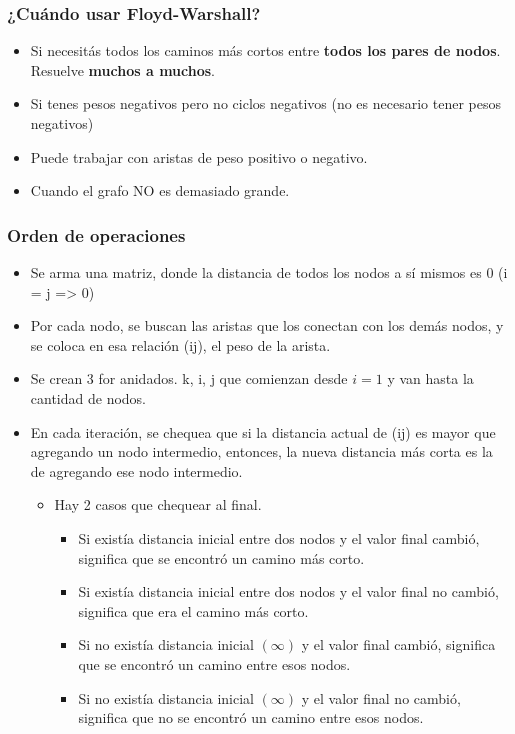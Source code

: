 \documentclass[10pt,a4paper]{article}
\begin{document}
\subsubsection*{¿Cuándo usar Floyd-Warshall?}
\begin{itemize}
    \item Si necesitás todos los caminos más cortos entre \textbf{todos los pares de nodos}. Resuelve \textbf{muchos a muchos}.
    \item Si tenes pesos negativos pero no ciclos negativos (no es necesario tener pesos negativos)
    \item Puede trabajar con aristas de peso positivo o negativo.
    \item Cuando el grafo NO es demasiado grande.
\end{itemize}
\subsubsection*{Orden de operaciones}
\begin{itemize}
    \item Se arma una matriz, donde la distancia de todos los nodos a sí mismos es 0 (i = j => 0)
    \item Por cada nodo, se buscan las aristas que los conectan con los demás nodos, y se coloca en esa relación (ij), el peso de la arista.
    \item Se crean 3 for anidados. k, i, j que comienzan desde $i=1$ y van hasta la cantidad de nodos. 
    \item En cada iteración, se chequea que si la distancia actual de (ij) es mayor que agregando un nodo intermedio, entonces, la nueva distancia más corta es la de agregando ese nodo intermedio.
    \begin{itemize}
        \item Hay 2 casos que chequear al final.
        \begin{itemize}
            \item Si existía distancia inicial entre dos nodos y el valor final cambió, significa que se encontró un camino más corto.
            \item Si existía distancia inicial entre dos nodos y el valor final no cambió, significa que era el camino más corto.
            \item Si no existía distancia inicial $(\infty)$ y el valor final cambió, significa que se encontró un camino entre esos nodos.
            \item Si no existía distancia inicial $(\infty)$ y el valor final no cambió, significa que no se encontró un camino entre esos nodos.
        \end{itemize}
    \end{itemize}
\end{itemize}
\end{document}
